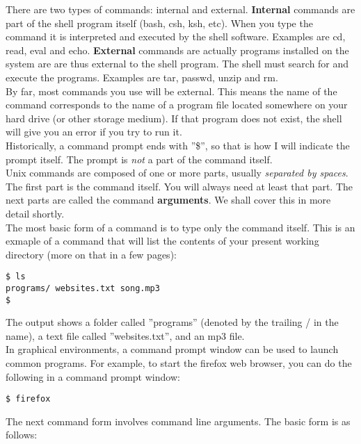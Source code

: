 There are two types of commands: internal and external.  \textbf{Internal} commands are part of the shell program itself (bash, csh, ksh, etc).  When you type the command it is interpreted and executed by the shell software.  Examples are cd, read, eval and echo.  \textbf{External} commands are actually programs installed on the system are are thus external to the shell program.  The shell must search for and execute the programs.  Examples are tar, passwd, unzip and rm.\\

By far, most commands you use will be external.  This means the name of the command corresponds to the name of a program file located somewhere on your hard drive (or other storage medium).  If that program does not exist, the shell will give you an error if you try to run it.\\

Historically, a command prompt ends with ''\$'', so that is how I will indicate the prompt itself.  The prompt is \textit{not} a part of the command itself.\\

Unix commands are composed of one or more parts, usually \textit{separated by spaces}. The first part is the command itself.  You will always need at least that part.  The next parts are called the command \textbf{arguments}.  We shall cover this in more detail shortly.\\

The most basic form of a command is to type only the command itself.  This is an exmaple of a command that will list the contents of your present working directory (more on that in a few pages):

\begin{verbatim}
$ ls
programs/ websites.txt song.mp3
$
\end{verbatim}

The output shows a folder called ''programs'' (denoted by the trailing / in the name), a text file called ''websites.txt'', and an mp3 file.\\

In graphical environments, a command prompt window can be used to launch common programs.  For example, to start the firefox web browser, you can do the following in a command prompt window:

\begin{verbatim}
$ firefox
\end{verbatim} 
The next command form involves command line arguments.  The basic form is as follows:

